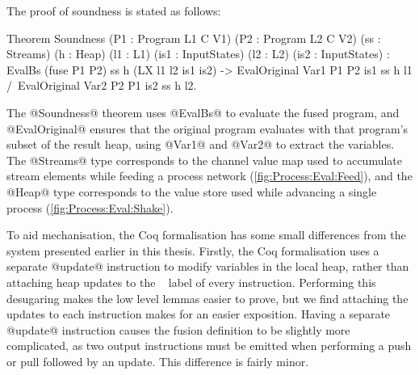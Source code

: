 The proof of soundness is stated as follows:


\begin{coq}
Theorem Soundness (P1 : Program L1 C V1) (P2  : Program L2 C V2)
                  (ss : Streams)         (h   : Heap)
                  (l1 : L1)              (is1 : InputStates)
                  (l2 : L2)              (is2 : InputStates)
  :  EvalBs (fuse P1 P2) ss h (LX l1 l2 is1 is2)
  -> EvalOriginal Var1 P1 P2 is1 ss h l1
  /\ EvalOriginal Var2 P2 P1 is2 ss h l2.
\end{coq}

The @Soundness@ theorem uses @EvalBs@ to evaluate the fused program, and @EvalOriginal@ ensures that the original program evaluates with that program's subset of the result heap, using @Var1@ and @Var2@ to extract the variables.
The @Streams@ type corresponds to the channel value map used to accumulate stream elements while feeding a process network (\cref{fig:Process:Eval:Feed}), and the @Heap@ type corresponds to the value store used while advancing a single process (\cref{fig:Process:Eval:Shake}).


To aid mechanisation, the Coq formalisation has some small differences from the system presented earlier in this thesis.
Firstly, the Coq formalisation uses a separate @update@ instruction to modify variables in the local heap, rather than attaching heap updates to the \Next~ label of every instruction.
Performing this desugaring makes the low level lemmas easier to prove, but we find attaching the updates to each instruction makes for an easier exposition.
Having a separate @update@ instruction causes the fusion definition to be slightly more complicated, as two output instructions must be emitted when performing a push or pull followed by an update.
This difference is fairly minor.

